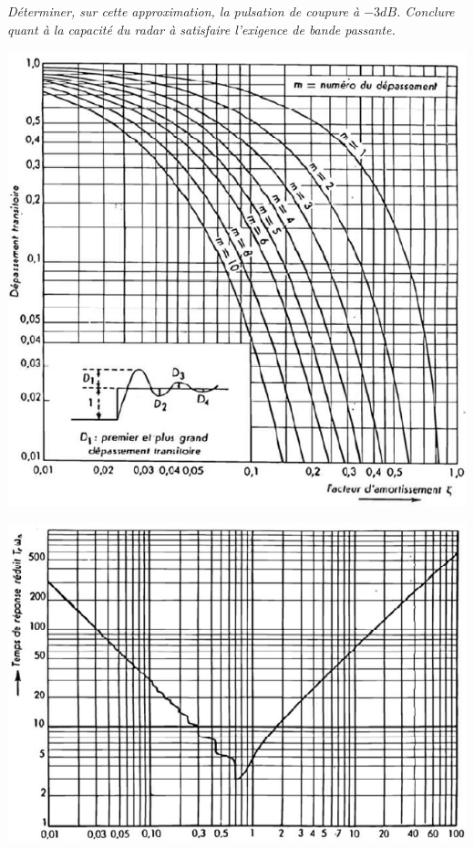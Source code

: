 \documentclass[10pt]{article}
\begin{document}
\subparagraph{}
\textit{Déterminer, sur cette approximation, la pulsation de coupure à $-3dB$. Conclure quant à la capacité du radar à satisfaire l'exigence de bande passante.}


 \begin{center}
\includegraphics[width=.8\textwidth]{images/exo1_3}

\includegraphics[width=.8\textwidth]{images/exo1_4}
\end{center}
\end{document}
